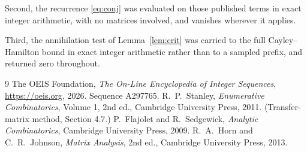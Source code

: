 \documentclass[11pt,a4paper]{article}
\theoremstyle{plain}
\theoremstyle{definition}
\begin{document}
Second, the recurrence \eqref{eq:conj} was evaluated on those published terms in exact
integer arithmetic, with no matrices involved, and vanishes wherever it applies.

Third, the annihilation test of Lemma~\ref{lem:crit} was carried to the full
Cayley--Hamilton bound in exact integer arithmetic rather than to a sampled prefix, and
returned zero throughout.

\begin{thebibliography}{9}
 The OEIS Foundation, \emph{The On-Line Encyclopedia of Integer
Sequences}, \url{https://oeis.org}, 2026. Sequence A297765.
 R.~P.~Stanley, \emph{Enumerative Combinatorics}, Volume 1, 2nd ed.,
Cambridge University Press, 2011. (Transfer-matrix method, Section 4.7.)
 P.~Flajolet and R.~Sedgewick, \emph{Analytic Combinatorics}, Cambridge
University Press, 2009.
 R.~A.~Horn and C.~R.~Johnson, \emph{Matrix Analysis}, 2nd ed., Cambridge
University Press, 2013.
\end{thebibliography}
\end{document}
